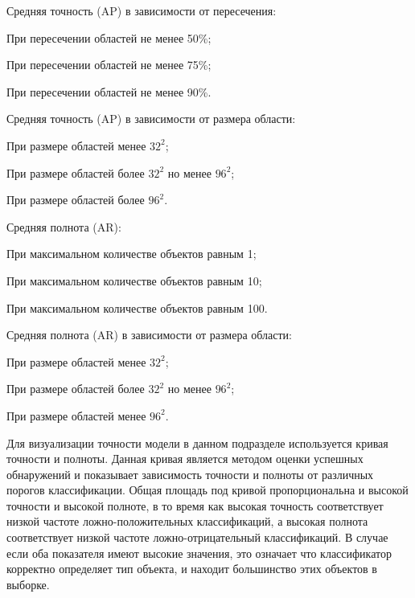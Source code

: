 %
\begin{itemize*}
  \item Средняя точность (AP) в зависимости от пересечения:
	\begin{itemize*}
	  \item При пересечении областей не менее 50\%;
	  \item При пересечении областей не менее 75\%;
	  \item При пересечении областей не менее 90\%.	  
	\end{itemize*}
  \item Средняя точность (AP) в зависимости от размера области:
	\begin{itemize*}
	  \item При размере областей менее \(32^2\);
	  \item При размере областей более \(32^2\) но менее \(96^2\);
	  \item При размере областей более \(96^2\).
	\end{itemize*}
  \item Средняя полнота (AR):
	\begin{itemize*}
	  \item При максимальном количестве объектов равным 1;
	  \item При максимальном количестве объектов равным 10;
	  \item При максимальном количестве объектов равным 100.
	\end{itemize*}
  \item Средняя полнота (AR) в зависимости от размера области:
	\begin{itemize*}
	  \item При размере областей менее \(32^2\);
	  \item При размере областей более \(32^2\) но менее \(96^2\);
	  \item При размере областей менее \(96^2\).
	\end{itemize*}
\end{itemize*}
%

Для визуализации точности модели в данном подразделе используется кривая точности и полноты. Данная кривая является методом оценки успешных обнаружений и показывает зависимость точности и полноты от различных порогов классификации. Общая площадь под кривой пропорциональна и высокой точности и высокой полноте, в то время как высокая точность соответствует низкой частоте ложно-положительных классификаций, а высокая полнота соответствует низкой частоте ложно-отрицательный классификаций. В случае если оба показателя имеют высокие значения, это означает что классификатор корректно определяет тип объекта, и находит большинство этих объектов в выборке.

